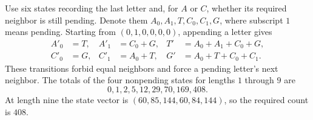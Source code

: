 Use six states recording the last letter and, for $A$ or $C$, whether its required neighbor is still pending. Denote them $A_0,A_1,T,C_0,C_1,G$, where subscript $1$ means pending. Starting from $(0,1,0,0,0,0)$, appending a letter gives
\[
\begin{aligned}
A'_0&=T,& A'_1&=C_0+G,&T'&=A_0+A_1+C_0+G,\\
C'_0&=G,& C'_1&=A_0+T,&G'&=A_0+T+C_0+C_1.
\end{aligned}
\]
These transitions forbid equal neighbors and force a pending letter's next neighbor. The totals of the four nonpending states for lengths $1$ through $9$ are
\[
0,1,2,5,12,29,70,169,408.
\]
At length nine the state vector is $(60,85,144,60,84,144)$, so the required count is $\boxed{408}$.
